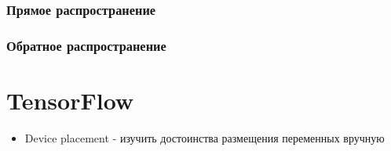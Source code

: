 \documentclass{report}
\numberwithin{theorem}{chapter}
\numberwithin{statement}{chapter}
\numberwithin{lemma}{chapter}
\theoremstyle{definition}
\numberwithin{task}{chapter}
\theoremstyle{remark}
\numberwithin{example}{chapter}
\theoremstyle{definition}
\numberwithin{definition}{chapter}
\theoremstyle{remark}
\theoremstyle{remark}
\numberwithin{lyrics}{section}
\begin{document}
\subsection{Прямое распространение}

\subsection{Обратное распространение}

\chapter{TensorFlow}

\begin{itemize}
	\item Device placement - изучить достоинства размещения переменных вручную
\end{itemize}



\end{document}
